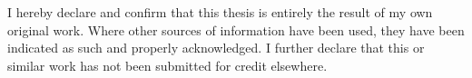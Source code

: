 \begin{declaration}
	I hereby declare and confirm that this thesis is entirely the result of my own original work. Where other sources of information have been used, they have been indicated as such and properly acknowledged. I further declare that this or similar work has not been submitted for credit elsewhere.
\end{declaration}